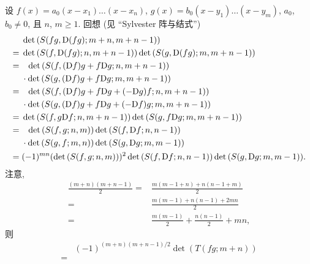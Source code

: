 \documentclass[../libro.tex]{subfiles}
\begin{document}
\begin{example}
    设 \(f(x) = a_0 (x - x_1) \dots (x - x_n)\),
    \(g(x) = b_0 (x - y_1) \dots (x - y_m)\),
    \(a_0\), \(b_0 \neq 0\),
    且 \(n\), \(m \geq 1\).
    回想 (见 ``Sylvester 阵与结式'')
    \begin{align*}
        &
        \det {(S(f g, \mathrm{D} (f g); m + n, m + n - 1))}
        \\
        = {} &
        \det {(S(f, \mathrm{D} (f g); n, m + n - 1))}
        \det {(S(g, \mathrm{D} (f g); m, m + n - 1))}
        \\
        = {} &
        \hphantom{\cdot\,\,}
        \det {(S(f, (\mathrm{D} f) g + f \mathrm{D} g; n, m + n - 1))}
        \\
        &
        \cdot
        \det {(S(g, (\mathrm{D} f) g + f \mathrm{D} g; m, m + n - 1))}
        \\
        = {} &
        \hphantom{\cdot\,\,}
        \det {(S(f, (\mathrm{D} f) g + f \mathrm{D} g
        + (-\mathrm{D} g) f; n, m + n - 1))}
        \\
        &
        \cdot
        \det {(S(g, (\mathrm{D} f) g + f \mathrm{D} g
        + (-\mathrm{D} f) g; m, m + n - 1))}
        \\
        = {} &
        \det {(S(f, g \mathrm{D} f; n, m + n - 1))}
        \det {(S(g, f \mathrm{D} g; m, m + n - 1))}
        \\
        = {} &
        \hphantom{\cdot\,\,}
        \det {(S(f, g; n, m))}
        \det {(S(f, \mathrm{D} f; n, n-1))}
        \\
        &
        \cdot
        \det {(S(g, f; m, n))}
        \det {(S(g, \mathrm{D} g; m, m-1))}
        \\
        = {} &
        (-1)^{m n} (\det {(S(f, g; n, m))})^2
        \det {(S(f, \mathrm{D} f; n, n-1))}
        \det {(S(g, \mathrm{D} g; m, m-1))}.
    \end{align*}
    注意,
    \begin{align*}
        \frac{(m+n) (m+n-1)}{2}
        = {} &
        \frac{m (m-1+n) + n (n-1+m)}{2}
        \\
        = {} &
        \frac{m(m-1) + n(n-1) + 2mn}{2}
        \\
        = {} &
        \frac{m(m-1)}{2} + \frac{n(n-1)}{2} + m n,
    \end{align*}
    则
    \begin{align*}
        &
        (-1)^{(m+n) (m+n-1)/2} \det {(T(f g; m + n))}
        \\
        = {} &

\end{align*}
\end{example}
\end{document}
